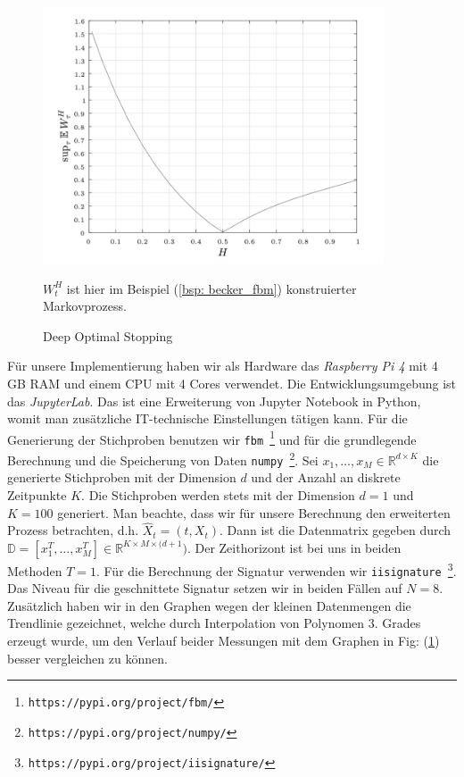 \documentclass[12pt,titlepage,headsepline]{article}
\begin{document}
        \begin{figure}[H]
          \caption{Deep Optimal Stopping \cite{becker_deep_2019}}
          \centering
          \includegraphics[width=0.9\textwidth]{becker_expec_vs_hurst.jpg}
          {\footnotesize
          \hfill\break
          $W_t^H$ ist hier im Beispiel (\ref{bsp: becker_fbm}) konstruierter Markovprozess.
          \par}
          \label{fig: becker_expec_vs_hurst}
        \end{figure}
        \hfill\break
        Für unsere Implementierung haben wir als Hardware das \textit{Raspberry Pi 4} mit 4 GB RAM und einem CPU mit 4 Cores verwendet. Die Entwicklungsumgebung ist das \textit{JupyterLab}. Das ist eine Erweiterung von Jupyter Notebook in Python, womit man zusätzliche IT-technische Einstellungen tätigen kann. Für die Generierung der Stichproben benutzen wir \texttt{fbm \footnote{https://pypi.org/project/fbm/}} und für die grundlegende Berechnung und die Speicherung von Daten \texttt{numpy \footnote{https://pypi.org/project/numpy/}}.
        \hfill\break
        Sei $x_1,\ldots,x_M \in \mathbb{R}^{d \times K}$ die generierte Stichproben mit der Dimension $d$ und der Anzahl an diskrete Zeitpunkte $K$. Die Stichproben werden stets mit der Dimension $d=1$ und $K=100$ generiert. Man beachte, dass wir für unsere Berechnung den erweiterten Prozess betrachten, d.h. $\hat{X}_t = (t,X_t)$. Dann ist die Datenmatrix gegeben durch
        $\mathbb{D} = [x_1^T,\ldots,x_M^T] \in \mathbb{R}^{K \times M \times ({d+1}})$. Der Zeithorizont ist bei uns in beiden Methoden $T=1$. Für die Berechnung der Signatur verwenden wir \texttt{iisignature \footnote{https://pypi.org/project/iisignature/}}. Das Niveau für die geschnittete Signatur setzen wir in beiden Fällen auf $N=8$. Zusätzlich haben wir in den Graphen wegen der kleinen Datenmengen die Trendlinie gezeichnet, welche durch Interpolation von Polynomen $3.$ Grades erzeugt wurde, um den Verlauf beider Messungen mit dem Graphen in Fig: (\ref{fig: becker_expec_vs_hurst}) besser vergleichen zu können.
\end{document}

